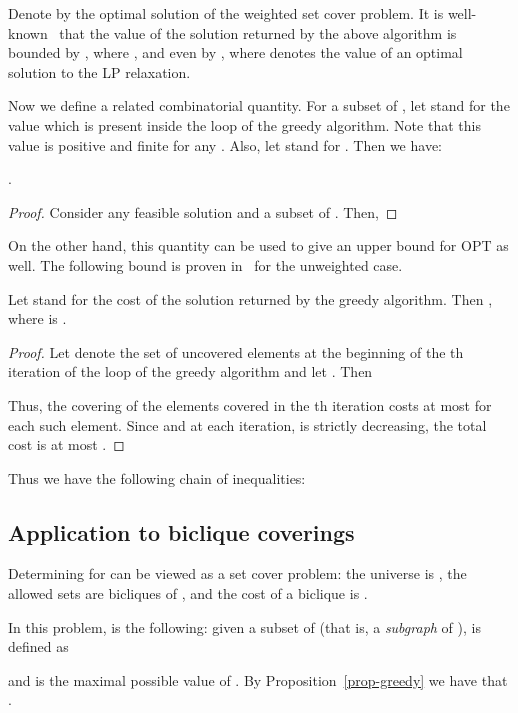 \documentclass[submission]{llncs}
\begin{document}
Denote by  the optimal solution of the weighted set cover problem.
It is well-known~\cite{chvatal1979setcover,Johnson:1973:AAC:800125.804034,Lovasz1975383,Stein1974391} that the value of the solution returned by the above algorithm is bounded by , where , and even by ,
  where  denotes the value of an optimal solution to the LP relaxation.


  Now we define a related combinatorial quantity.
  For a subset  of , let  stand for the value  which is
  present inside the loop of the greedy algorithm. Note that this value is positive and finite for any .
  Also, let  stand for . Then we have:
  \begin{proposition}
  \label{prop-rhostar-opt}
  .
  \end{proposition}
  \begin{proof}
  Consider any feasible solution  and a subset  of .
  Then,
  
  \end{proof}


  On the other hand, this quantity can be used to give an upper bound for OPT as well.
  The following bound is proven in~\cite{LovaszThesis} for the unweighted case.
\begin{proposition}
  \label{prop-greedy}
  Let  stand for the cost of the solution returned by the greedy algorithm. Then ,
where  is .
  \end{proposition}
  \begin{proof}
  Let  denote the set of uncovered elements at the beginning of the th iteration of the loop of the greedy algorithm
  and let .
  Then
  
  Thus, the covering of the elements covered in the th iteration costs at most  for each such element.
  Since  and at each iteration,  is strictly decreasing,
  the total cost is at most .
  \end{proof}
Thus we have the following chain of inequalities:
  
\subsection{Application to biclique coverings}
\label{sec-setcover-cov}
  Determining  for  can be viewed as a set cover problem: the universe is ,
  the allowed sets are bicliques of , and the cost of a biclique  is .

  In this problem,  is the following:
  given a subset  of  (that is, a \emph{subgraph}  of ),
   is defined as
  
  and  is the maximal possible value of .
  By Proposition~\ref{prop-greedy} we have that .
\end{document}
